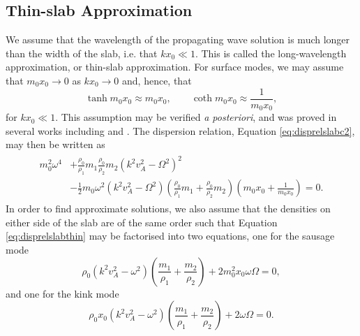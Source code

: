 \documentclass[12pt]{ociamthesis}
\begin{document}
\subsection{Thin-slab Approximation}
\label{subsec:thin}

We assume that the wavelength of the propagating wave solution is much longer than the width of the slab, i.e. that $k x_0 \ll 1$.
This is called the long-wavelength approximation, or thin-slab approximation.
For surface modes, we may assume that $m_0 x_0 \to 0$ as $k x_0 \to 0$ and, hence, that
\begin{equation}
\tanh m_0 x_0 \approx m_0 x_0, \qquad \coth m_0 x_0 \approx \frac{1}{m_0 x_0},
\end{equation}
for $k x_0 \ll 1$.
This assumption may be verified \emph{a posteriori}, and was proved in several works including \cite{Roberts1981b} and \cite{Allcock2017}.
The dispersion relation, Equation \eqref{eq:disprelslabc2}, may then be written as
\begin{align}
\label{eq:disprelslabthin}
\begin{split}
m_0^2 \omega^4 
& + \frac{\rho_0}{\rho_1} m_1 \frac{\rho_0}{\rho_2} m_2 ( k^2 v_A^2 - \Omega^2 )^2 
\\[0.3cm]
& - \frac{1}{2} m_0 \omega^2
(k^2 v_A^2 - \Omega^2)
\left( \frac{\rho_0}{\rho_1} m_1 + \frac{\rho_0}{\rho_2} m_2 \right)
\left( m_0 x_0 + \frac{1}{m_0 x_0} \right)
= 0.
\end{split}
\end{align}
In order to find approximate solutions, we also assume that the densities on either side of the slab are of the same order such that Equation \eqref{eq:disprelslabthin} may be factorised into two equations, one for the sausage mode
%
\begin{equation}
\label{eq:disprelslabthinsaus}
\rho_0 (k^2 v_A^2 - \omega^2) \left( \frac{m_1}{\rho_1} + \frac{m_2}{\rho_2} \right)
+ 2 m_0^2 x_0 \omega \Omega = 0,
\end{equation}
%
and one for the kink mode
%
\begin{equation}
\label{eq:disprelslabthinkink}
\rho_0 x_0 (k^2 v_A^2 - \omega^2) \left( \frac{m_1}{\rho_1} + \frac{m_2}{\rho_2} \right)
+ 2 \omega \Omega = 0.
\end{equation}
%
\end{document}
